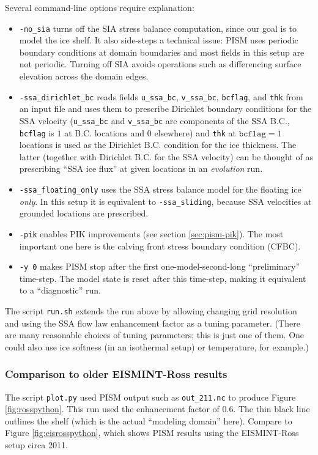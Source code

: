 Several command-line options require explanation:
\begin{itemize}
\item \texttt{-no_sia} turns off the SIA stress balance computation, since our
  goal is to model the ice shelf. It also side-steps a technical issue: PISM
  uses periodic boundary conditions at domain boundaries and most fields in
  this setup are not periodic. Turning off SIA avoids operations such as
  differencing surface elevation across the domain edges.
\item \texttt{-ssa_dirichlet_bc} reads fields \texttt{u_ssa_bc}, \texttt{v_ssa_bc}, \texttt{bcflag}, and \texttt{thk} from an input file and uses them to prescribe Dirichlet boundary conditions for the SSA velocity (\texttt{u_ssa_bc} and \texttt{v_ssa_bc} are components of the SSA B.C., \texttt{bcflag} is $1$ at B.C. locations and $0$ elsewhere) and \texttt{thk} at $\mathtt{bcflag} = 1$ locations is used as the Dirichlet B.C. condition for the ice thickness. The latter (together with Dirichlet B.C. for the SSA velocity) can be thought of as prescribing ``SSA ice flux'' at given locations in an \emph{evolution} run.
\item \texttt{-ssa_floating_only} uses the SSA stress balance model for the floating ice \emph{only}. In this setup it is equivalent to \texttt{-ssa_sliding}, because SSA velocities at grounded locations are prescribed.
\item \texttt{-pik} enables PIK improvements (see section \ref{sec:pism-pik}). The most important one here is the calving front stress boundary condition (CFBC).
\item \texttt{-y 0} makes PISM stop after the first one-model-second-long ``preliminary'' time-step. The model state is reset after this time-step, making it equivalent to a ``diagnostic'' run.
\end{itemize}

The script \texttt{run.sh} extends the run above by allowing changing grid resolution and using the SSA flow law enhancement factor as a tuning parameter. (There are many reasonable choices of tuning parameters; this is just one of them. One could also use ice softness (in an isothermal setup) or temperature, for example.)

\subsubsection*{Comparison to older EISMINT-Ross results}

The script \texttt{plot.py} used PISM output such as \texttt{out_211.nc} to produce Figure \ref{fig:rosspython}. This run used the enhancement factor of $0.6$. The thin black line outlines the shelf (which is the actual ``modeling domain'' here). Compare to Figure \ref{fig:eisrosspython}, which shows PISM results using the EISMINT-Ross setup circa 2011.

